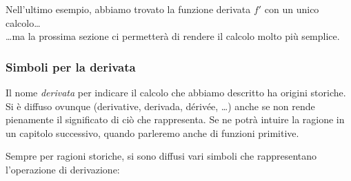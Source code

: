 Nell'ultimo esempio, abbiamo trovato la funzione derivata \(f'\) con un 
unico calcolo\dots\\
\dots ma la prossima sezione ci permetterà di rendere il calcolo molto più 
semplice.
% 

\subsubsection{Simboli per la derivata}
Il nome \emph{derivata} per indicare il calcolo che abbiamo descritto ha 
origini storiche. Si è diffuso  ovunque (derivative, derivada, dérivée, 
\dots) anche se non rende pienamente il significato di ciò che rappresenta. 
Se ne potrà intuire la ragione in un capitolo successivo, quando parleremo 
anche di funzioni primitive.

Sempre per ragioni storiche, si sono diffusi vari simboli che rappresentano 
l'operazione di derivazione:


